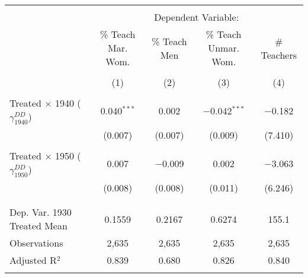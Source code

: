 
\begin{tabular}{@{\extracolsep{5pt}}lcccc} 
\\[-1.8ex]\hline 
\hline \\[-1.8ex] 
 & \multicolumn{4}{c}{Dependent Variable:} \\ 
\cline{2-5} 
 & \% Teach Mar. Wom. & \% Teach Men & \% Teach Unmar. Wom. & \# Teachers \\ 
\\[-1.8ex] & (1) & (2) & (3) & (4)\\ 
\hline \\[-1.8ex] 
 Treated $\times$ 1940 ($\gamma_{1940}^{DD}$) & 0.040$^{***}$ & 0.002 & $-$0.042$^{***}$ & $-$0.182 \\ 
  & (0.007) & (0.007) & (0.009) & (7.410) \\ 
  & & & & \\ 
 Treated $\times$ 1950 ($\gamma_{1950}^{DD}$) & 0.007 & $-$0.009 & 0.002 & $-$3.063 \\ 
  & (0.008) & (0.008) & (0.011) & (6.246) \\ 
  & & & & \\ 
\hline \\[-1.8ex] 
Dep. Var. 1930 Treated Mean & 0.1559 & 0.2167 & 0.6274 & 155.1 \\ 
Observations & 2,635 & 2,635 & 2,635 & 2,635 \\ 
Adjusted R$^{2}$ & 0.839 & 0.680 & 0.826 & 0.840 \\ 
\hline 
\hline \\[-1.8ex] 
\end{tabular} 
